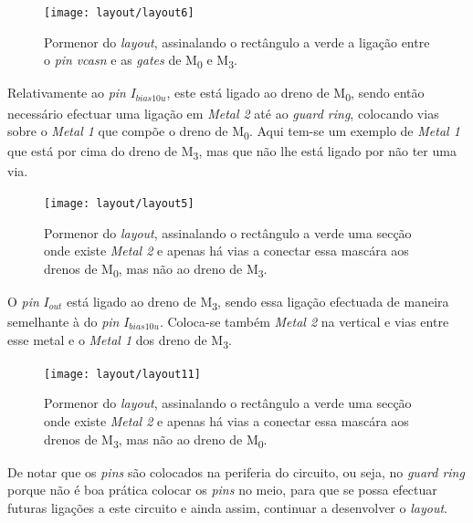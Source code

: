 \documentclass[11pt]{article}
\numberwithin{equation}{section}
\begin{document}
\begin{figure}[H]
	\centering
	\texttt{[image: layout/layout6]}
	\vspace{-0.8em}
	\caption{Pormenor do \textit{layout}, assinalando o rectângulo a verde a ligação entre o \textit{pin} \textit{vcasn} e as \textit{gates} de M\textsubscript{0} e M\textsubscript{3}.}
	\vspace{-0.8em}
\end{figure}

Relativamente ao \textit{pin} $I_{bias10u}$, este está ligado ao dreno de M\textsubscript{0}, sendo então necessário efectuar uma ligação em \textit{Metal 2} até ao \textit{guard ring}, colocando vias sobre o \textit{Metal 1} que compõe o dreno de M\textsubscript{0}. Aqui tem-se um exemplo de \textit{Metal 1} que está por cima do dreno de M\textsubscript{3}, mas que não lhe está ligado por não ter uma via.   

\begin{figure}[H]
	\centering
	\texttt{[image: layout/layout5]}
	\vspace{-0.8em}
	\caption{Pormenor do \textit{layout}, assinalando o rectângulo a verde uma secção onde existe \textit{Metal 2} e apenas há vias a conectar essa mascára aos drenos de M\textsubscript{0}, mas não ao dreno de M\textsubscript{3}.}
	\vspace{-0.8em}
\end{figure}

O \textit{pin} $I_{out}$ está ligado ao dreno de M\textsubscript{3}, sendo essa ligação efectuada de maneira semelhante à do \textit{pin} $I_{bias10u}$. Coloca-se também \textit{Metal 2} na vertical e vias entre esse metal e o \textit{Metal 1} dos dreno de M\textsubscript{3}.

\begin{figure}[H]
	\centering
	\texttt{[image: layout/layout11]}
	\vspace{-0.8em}
	\caption{Pormenor do \textit{layout}, assinalando o rectângulo a verde uma secção onde existe \textit{Metal 2} e apenas há vias a conectar essa mascára aos drenos de M\textsubscript{3}, mas não ao dreno de M\textsubscript{0}.}
	\vspace{-0.8em}
\end{figure}

De notar que os \textit{pins} são colocados na periferia do circuito, ou seja, no \textit{guard ring} porque não é boa prática colocar os \textit{pins} no meio, para que se possa efectuar futuras ligações a este circuito e ainda assim, continuar a desenvolver o \textit{layout}.
\end{document}

